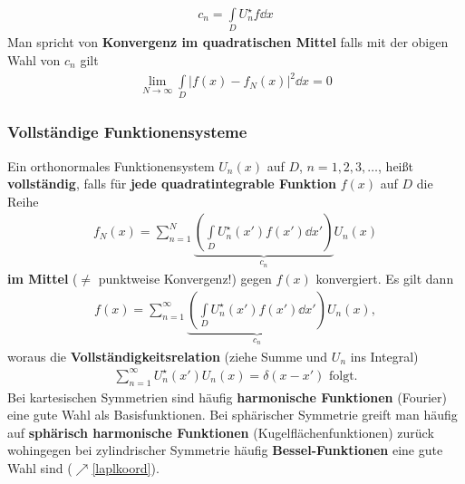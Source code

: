 		        \begin{equation}\begin{split}
				        \boxed{c_n = \int\limits_D U_n^\star f \dd x}
			        \end{split}\end{equation}
		   Man spricht von \textbf{Konvergenz im quadratischen Mittel} falls mit der obigen Wahl von $c_n$ gilt
		        \begin{equation}\begin{split}
				        \lim_{N\to\infty} \int\limits_D |f(x) - f_N(x)|^2 \dd x = 0
			        \end{split}\end{equation}

	  \subsubsection{Vollständige Funktionensysteme}
		  Ein orthonormales Funktionensystem $U_n(x)$ auf $D$, $n= 1, 2, 3,\dots$, heißt \textbf{vollständig}, falls für \textbf{jede quadratintegrable Funktion} $f(x)$ auf $D$ die Reihe
		  \begin{equation}\begin{split}
				  f_N(x) = \sum_{n=1}^N \underbrace{\left(\int\limits_D U_n^\star(x') f(x') \dd x'\right)}_{c_n} U_n(x)
			  \end{split}\end{equation}
		  \textbf{im Mittel} ($\neq$ punktweise Konvergenz!) gegen $f(x)$ konvergiert.
		  Es gilt dann
		  \begin{equation}\begin{split}
				  f(x) = \sum_{n=1}^\infty \underbrace{\left(\int\limits_D U_n^\star(x') f(x') \dd x'\right)}_{c_n} U_n(x),
			  \end{split}\end{equation}
		  woraus die \textbf{Vollständigkeitsrelation} (ziehe Summe und $U_n$ ins Integral)
		  \begin{equation}\label{vollst}\begin{split}
				  \sum_{n=1}^\infty U_n^\star(x') U_n(x) = \delta(x-x') \text{ folgt.}
			  \end{split}\end{equation}
		  Bei kartesischen Symmetrien sind häufig \textbf{harmonische Funktionen} (Fourier) eine gute Wahl als Basisfunktionen.
		  Bei sphärischer Symmetrie greift man häufig auf \textbf{sphärisch harmonische Funktionen} (Kugelflächenfunktionen) zurück wohingegen
		  bei zylindrischer Symmetrie häufig \textbf{Bessel-Funktionen} eine gute Wahl sind ($\nearrow$\ref{laplkoord}).
